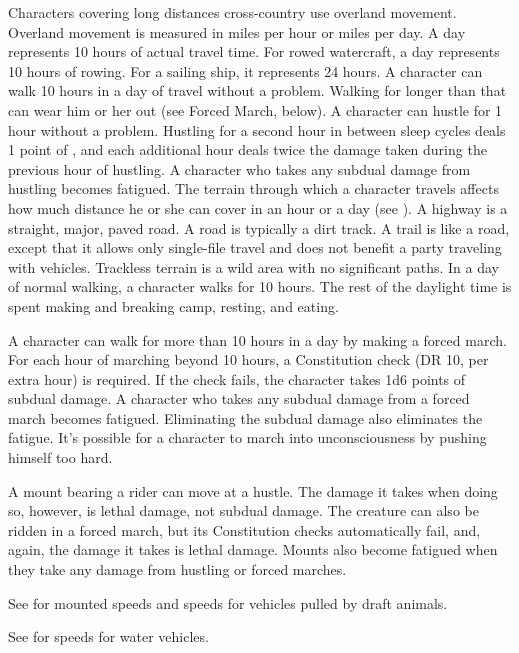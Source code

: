 Characters covering long distances cross-country use overland movement. Overland movement is measured in miles per hour or miles per day. A day represents 10 hours of actual travel time. For rowed watercraft, a day represents 10 hours of rowing. For a sailing ship, it represents 24 hours.
 A character can walk 10 hours in a day of travel without a problem. Walking for longer than that can wear him or her out (see Forced March, below).
 A character can hustle for 1 hour without a problem. Hustling for a second hour in between sleep cycles deals 1 point of , and each additional hour deals twice the damage taken during the previous hour of hustling. A character who takes any subdual damage from hustling becomes fatigued.
 The terrain through which a character travels affects how much distance he or she can cover in an hour or a day (see ). A highway is a straight, major, paved road. A road is typically a dirt track. A trail is like a road, except that it allows only single-file travel and does not benefit a party traveling with vehicles. Trackless terrain is a wild area with no significant paths.
\label{Forced March} In a day of normal walking, a character walks for 10 hours. The rest of the daylight time is spent making and breaking camp, resting, and eating.

A character can walk for more than 10 hours in a day by making a forced march. For each hour of marching beyond 10 hours, a Constitution check (DR 10,  per extra hour) is required. If the check fails, the character takes 1d6 points of subdual damage. A character who takes any subdual damage from a forced march becomes fatigued. Eliminating the subdual damage also eliminates the fatigue. It's possible for a character to march into unconsciousness by pushing himself too hard.

 A mount bearing a rider can move at a hustle. The damage it takes when doing so, however, is lethal damage, not subdual damage. The creature can also be ridden in a forced march, but its Constitution checks automatically fail, and, again, the damage it takes is lethal damage. Mounts also become fatigued when they take any damage from hustling or forced marches.

See  for mounted speeds and speeds for vehicles pulled by draft animals.

 See  for speeds for water vehicles.

